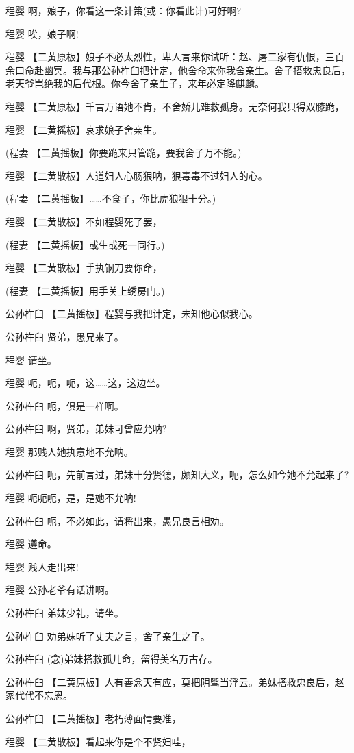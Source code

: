 程婴 啊，娘子，你看这一条计策(或：你看此计)可好啊?

程婴 唉，娘子啊!

程婴
【二黄原板】娘子不必太烈性，卑人言来你试听：赵、屠二家有仇恨，三百余口命赴幽冥。我与那公孙杵臼把计定，他舍命来你我舍亲生。舍子搭救忠良后，老天爷岂绝我的后代根。你今舍了亲生子，来年必定降麒麟。

程婴 【二黄原板】千言万语她不肯，不舍娇儿难救孤身。无奈何我只得双膝跪，

程婴 【二黄摇板】哀求娘子舍亲生。

(程妻 【二黄摇板】你要跪来只管跪，要我舍子万不能。)

程婴 【二黄散板】人道妇人心肠狠呐，狠毒毒不过妇人的心。

(程妻 【二黄摇板】\ldots{}\ldots{}不食子，你比虎狼狠十分。)

程婴 【二黄散板】不如程婴死了罢，

(程妻 【二黄摇板】或生或死一同行。)

程婴 【二黄散板】手执钢刀要你命，

(程妻 【二黄摇板】用手关上绣房门。)

公孙杵臼 【二黄摇板】程婴与我把计定，未知他心似我心。

公孙杵臼 贤弟，愚兄来了。

程婴 请坐。

程婴 呃，呃，呃，这\ldots{}\ldots{}这，这边坐。

公孙杵臼 呃，俱是一样啊。

公孙杵臼 啊，贤弟，弟妹可曾应允呐?

程婴 那贱人她执意地不允呐。

公孙杵臼 呃，先前言过，弟妹十分贤德，颇知大义，呃，怎么如今她不允起来了?

程婴 呃呃呃，是，是她不允呐!

公孙杵臼 呃，不必如此，请将出来，愚兄良言相劝。

程婴 遵命。

程婴 贱人走出来!

程婴 公孙老爷有话讲啊。

公孙杵臼 弟妹少礼，请坐。

公孙杵臼 劝弟妹听了丈夫之言，舍了亲生之子。

公孙杵臼 (念)弟妹搭救孤儿命，留得美名万古存。

公孙杵臼
【二黄原板】人有善念天有应，莫把阴骘当浮云。弟妹搭救忠良后，赵家代代不忘恩。

公孙杵臼 【二黄摇板】老朽薄面情要准，

程婴 【二黄散板】看起来你是个不贤妇哇，

